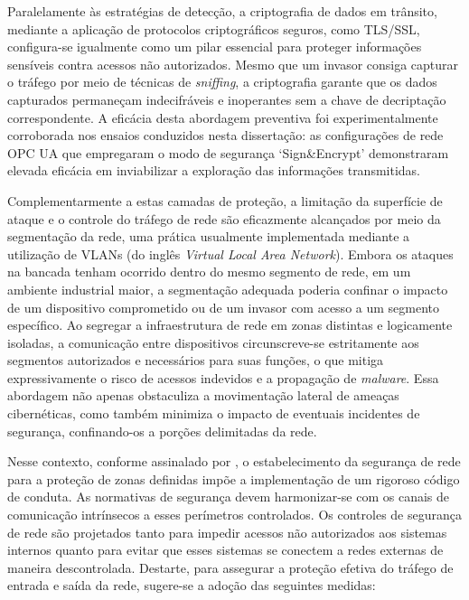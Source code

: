         Paralelamente às estratégias de detecção, a criptografia de dados em trânsito, mediante a aplicação de protocolos criptográficos seguros, como TLS/SSL, configura-se igualmente como um pilar essencial para proteger informações sensíveis contra acessos não autorizados. Mesmo que um invasor consiga capturar o tráfego por meio de técnicas de \textit{sniffing}, a criptografia garante que os dados capturados permaneçam indecifráveis e inoperantes sem a chave de decriptação correspondente. A eficácia desta abordagem preventiva foi experimentalmente corroborada nos ensaios conduzidos nesta dissertação: as configurações de rede OPC UA que empregaram o modo de segurança `Sign\&Encrypt' demonstraram elevada eficácia em inviabilizar a exploração das informações transmitidas.

        Complementarmente a estas camadas de proteção, a limitação da superfície de ataque e o controle do tráfego de rede são eficazmente alcançados por meio da segmentação da rede, uma prática usualmente implementada mediante a utilização de VLANs (do inglês \textit{Virtual Local Area Network}).  Embora os ataques na bancada tenham ocorrido dentro do mesmo segmento de rede, em um ambiente industrial maior, a segmentação adequada poderia confinar o impacto de um dispositivo comprometido ou de um invasor com acesso a um segmento específico. Ao segregar a infraestrutura de rede em zonas distintas e logicamente isoladas, a comunicação entre dispositivos circunscreve-se estritamente aos segmentos autorizados e necessários para suas funções, o que mitiga expressivamente o risco de acessos indevidos e a propagação de \textit{malware}. Essa abordagem não apenas obstaculiza a movimentação lateral de ameaças cibernéticas, como também minimiza o impacto de eventuais incidentes de segurança, confinando-os a porções delimitadas da rede.
        
        Nesse contexto, conforme assinalado por , o estabelecimento da segurança de rede para a proteção de zonas definidas impõe a implementação de um rigoroso código de conduta. As normativas de segurança devem harmonizar-se com os canais de comunicação intrínsecos a esses perímetros controlados. Os controles de segurança de rede são projetados tanto para impedir acessos não autorizados aos sistemas internos quanto para evitar que esses sistemas se conectem a redes externas de maneira descontrolada. Destarte, para assegurar a proteção efetiva do tráfego de entrada e saída da rede, sugere-se a adoção das seguintes medidas:
        
